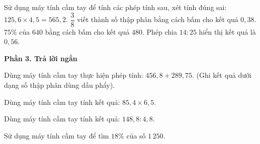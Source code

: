 \begin{ex} %
Sử dụng máy tính cầm tay để tính các phép tính sau, xét tính đúng sai:
\choiceTF
{\True $125{,}6 \times 4{,}5 = 565{,}2$.}
{$\dfrac{3}{8}$ viết thành số thập phân bằng cách bấm  \fbox{$\div$}  \fbox{=} cho kết quả $0{,}38$.}
{\True $75\%$ của $640$ bằng cách bấm  \fbox{$\times$}  \fbox{\%} cho kết quả $480$.}
{\True Phép chia $14 : 25$ hiển thị kết quả là $0{,}56$.}
\end{ex}

\textbf{Phần 3. Trả lời ngắn}

\begin{ex} %
Dùng máy tính cầm tay thực hiện phép tính: $456{,}8 + 289{,}75$. (Ghi kết quả dưới dạng số thập phân dùng dấu phẩy).
\end{ex}

\begin{ex} %
Dùng máy tính cầm tay tính kết quả: $85{,}4 \times 6{,}5$.
\end{ex}

\begin{ex} %
Dùng máy tính cầm tay tính kết quả: $148{,}8 : 4{,}8$.
\end{ex}

\begin{ex} %
Sử dụng máy tính cầm tay để tìm $18\%$ của số $1\,250$.
\end{ex}

